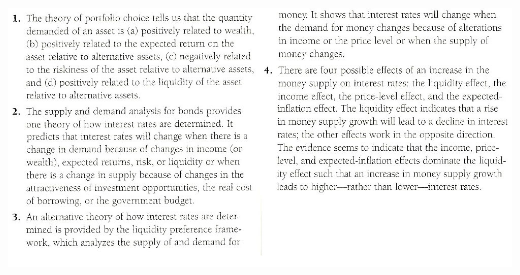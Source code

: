 \documentclass[12pt]{examnotes}
\begin{document}
\includegraphics[scale=0.5]{./imgs/5sum.jpg}
\end{document}
